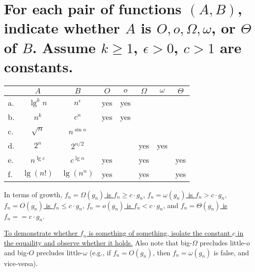\section[Problem 5]{For each pair of functions $(A, B)$, indicate whether $A$ is $O, o, \Omega, \omega$, or $\Theta$ of $B$. Assume $k \geq 1$, $\epsilon > 0$, $c > 1$ are constants.}

\begin{center}
	\begin{tabular}{lcc|c|c|c|c|c}
		& $A$ & $B$ & $O$ & $o$ & $\Omega$ & $\omega$ & $\Theta$ \\ \hline
		a. & $\lg^k n$ & $n^{\epsilon}$ & yes & yes &  &  &  \\ \hline
		b. & $n^k$ & $c^n$				& yes & yes &  &  &  \\ \hline
		c. & $\sqrt{n}$ & $n^{\sin n}$	&  &  &  &  &  \\ \hline
		d. & $2^n$ & $2^{n/2}$			&  &  & yes & yes &  \\ \hline
		e. & $n^{\lg c}$ & $c^{\lg n}$	& yes &  & yes &  & yes \\ \hline
		f. & $\lg(n!)$ & $\lg(n^n)$		& yes &  & yes &  & yes 
	\end{tabular}
\end{center}

\noindent
In terms of growth,
\ul{$f_n = \Omega(g_n)$ is	$f_n \geq c \cdot g_n$},
\ul{$f_n = \omega(g_n)$ is	$f_n > c \cdot g_n$},
\ul{$f_n = O(g_n)$ is		$f_n \leq c \cdot g_n$},
\ul{$f_n = o(g_n)$ is		$f_n < c \cdot g_n$}, and
\ul{$f_n = \Theta(g_n)$ is	$f_n == c \cdot g_n$}. 


\ul{To demonstrate whether $f_n$ is something of something, isolate the constant $c$ in the equaility and observe whether it holds.} Also note that big-$\Omega$ precludes little-$o$ and big-$O$ precludes little-$\omega$ (e.g., if $f_n = O(g_n)$, then $f_n = \omega(g_n)$ is false, and vice-versa).
